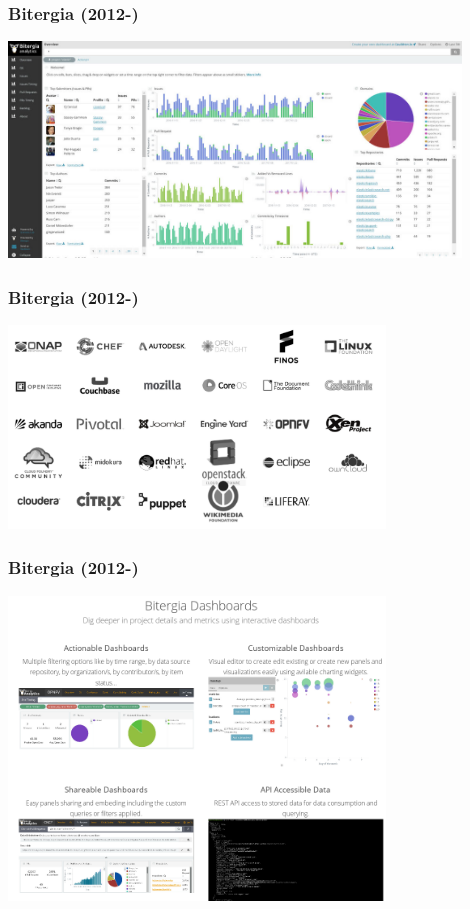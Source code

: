 \documentclass[17pt,aspectratio=169,hyperref=pdfusetitle]{beamer}
\begin{document}
\begin{frame}[fragile]
  \frametitle{Bitergia (2012-)}

  \begin{center}
  \includegraphics[width=12cm]{figs/bitergia-dashboard}
  \end{center}  
  
\end{frame}

\begin{frame}[fragile]
  \frametitle{Bitergia (2012-)}

  \begin{center}
  \includegraphics[width=10cm]{figs/bitergia-customers}
  \end{center}  
  
\end{frame}

\begin{frame}[fragile]
  \frametitle{Bitergia (2012-)}

  \begin{center}
  \includegraphics[width=10cm]{figs/bitergia-dashboards}
  \end{center}  
  
\end{frame}
\end{document}
